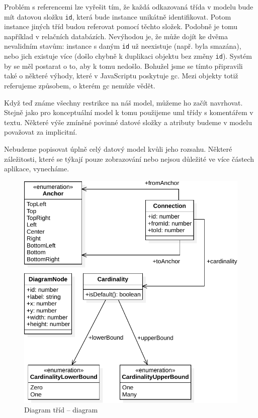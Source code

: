 Problém s referencemi lze vyřešit tím, že každá odkazovaná třída v modelu bude mít datovou složku \texttt{id}, která bude instance unikátně identifikovat.
Potom instance jiných tříd budou referovat pomocí těchto složek.
Podobně je tomu například v relačních databázích.
Nevýhodou je, že může dojít ke dvěma nevalidním stavům: instance s daným \texttt{id} už neexistuje (např. byla smazána), nebo jich existuje více (došlo chybně k duplikaci objektu bez změny \texttt{id}).
Systém by se měl postarat o to, aby k tomu nedošlo.
Bohužel jsme se tímto připravili také o některé výhody, které v JavaScriptu poskytuje \acrfull{gc}.
Mezi objekty totiž referujeme způsobem, o kterém \acrshort{gc} nemůže vědět.

Když teď známe všechny restrikce na náš model, můžeme ho začít navrhovat.
Stejně jako pro konceptuální model k tomu použijeme \acrshort{uml} třídy s komentářem v textu.
Některé výše zmíněné povinné datové složky a atributy budeme v modelu považovat za implicitní.

Nebudeme popisovat úplně celý datový model kvůli jeho rozsahu.
Některé záležitosti, které se týkají pouze zobrazování nebo nejsou důležité ve více částech aplikace, vynecháme.

\begin{figure}[!htb]
  \centering
  \includegraphics[width=\maxwidth{\textwidth}]{../img/diagrams/diagram-class-diagram.pdf}
  \caption{Diagram tříd -- diagram}
  \label{fig:diagram-class-diagram}
\end{figure}

